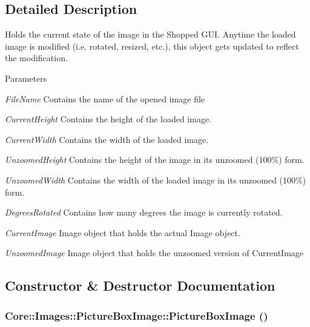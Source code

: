 \subsection{Detailed Description}
Holds the current state of the image in the Shopped GUI. Anytime the loaded image is modified (i.e. rotated, resized, etc.), this object gets updated to reflect the modification.


\begin{DoxyParams}{Parameters}
\item[{\em FileName}]Contains the name of the opened image file \item[{\em CurrentHeight}]Contains the height of the loaded image. \item[{\em CurrentWidth}]Contains the width of the loaded image. \item[{\em UnzoomedHeight}]Contains the height of the image in its unzoomed (100\%) form. \item[{\em UnzoomedWidth}]Contains the width of the loaded image in its unzoomed (100\%) form. \item[{\em DegreesRotated}]Contains how many degrees the image is currently rotated. \item[{\em CurrentImage}]Image object that holds the actual Image object. \item[{\em UnzoomedImage}]Image object that holds the unzoomed version of CurrentImage \end{DoxyParams}


\subsection{Constructor \& Destructor Documentation}
\hypertarget{class_core_1_1_images_1_1_picture_box_image_a3b7513c9b52aaaecbd5696bb3ea7fa69}{
\subsubsection[{PictureBoxImage}]{\setlength{\rightskip}{0pt plus 5cm}Core::Images::PictureBoxImage::PictureBoxImage ()}}
\label{class_core_1_1_images_1_1_picture_box_image_a3b7513c9b52aaaecbd5696bb3ea7fa69}


